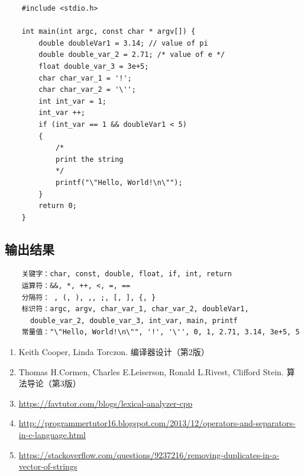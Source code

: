 \documentclass[11pt]{homework}
\begin{document}
\lstset{language=c}
  \begin{lstlisting}
    #include <stdio.h>

    int main(int argc, const char * argv[]) {
        double doubleVar1 = 3.14; // value of pi
        double double_var_2 = 2.71; /* value of e */
        float double_var_3 = 3e+5;
        char char_var_1 = '!';
        char char_var_2 = '\'';
        int int_var = 1;
        int_var ++;
        if (int_var == 1 && doubleVar1 < 5)
        {
            /*
            print the string
            */
            printf("\"Hello, World!\n\"");
        }
        return 0;
    }
  \end{lstlisting}

\subsection*{输出结果}

\lstset{language=c}
  \begin{lstlisting}
    关键字：char, const, double, float, if, int, return
    运算符：&&, *, ++, <, =, ==
    分隔符： , (, ), ,, ;, [, ], {, }
    标识符：argc, argv, char_var_1, char_var_2, doubleVar1, 
      double_var_2, double_var_3, int_var, main, printf
    常量值："\"Hello, World!\n\"", '!', '\'', 0, 1, 2.71, 3.14, 3e+5, 5
  \end{lstlisting}

\begin{enumerate}
  \item Keith Cooper, Linda Torczon. 编译器设计（第2版）
  \item Thomas H.Cormen, Charles E.Leiserson, Ronald L.Rivest, Clifford Stein. 算法导论（第3版）
  \item \href{https://favtutor.com/blogs/lexical-analyzer-cpp}{https://favtutor.com/blogs/lexical-analyzer-cpp}
  \item \href{http://programmertutor16.blogspot.com/2013/12/operators-and-separators-in-c-language.html}{http://programmertutor16.blogspot.com/2013/12/operators-and-separators-in-c-language.html}
  \item \href{https://stackoverflow.com/questions/9237216/removing-duplicates-in-a-vector-of-strings}{https://stackoverflow.com/questions/9237216/removing-duplicates-in-a-vector-of-strings}
\end{enumerate}
\end{document}

